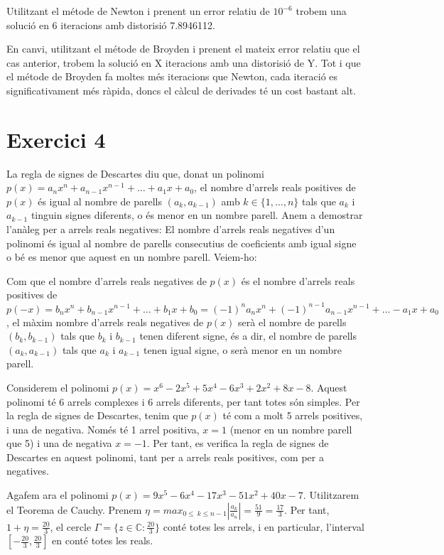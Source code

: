 \documentclass{article}
\begin{document}
Utilitzant el m\'etode de Newton i prenent un error relatiu de $10^{-6}$ trobem una soluci\'o en 6 iteracions amb distorisi\'o 7.8946112.

En canvi, utilitzant el m\'etode de Broyden i prenent el mateix error relatiu que el cas anterior, trobem la soluci\'o en X iteracions amb una distorisi\'o de Y. Tot i que el m\'etode de Broyden fa moltes m\'es iteracions que Newton, cada iteraci\'o es significativament m\'es r\`apida, doncs el c\`alcul de derivades t\'e un cost bastant alt.

\newpage
\section*{Exercici 4}
\quad La regla de signes de Descartes diu que, donat un polinomi $p(x) = a_n x^n + a_{n-1} x^{n-1} + \ldots + a_1 x + a_0$,
el nombre d'arrels reals positives de $p(x)$ és igual al nombre de parells $(a_k, a_{k-1})$ amb $k \in \{1, \ldots, n\}$ tals que $a_k$ i $a_{k-1}$ tinguin signes diferents, o és menor en un nombre parell. Anem a demostrar l'anàleg per a arrels reals negatives: El nombre d'arrels reals negatives d'un polinomi és igual al nombre de parells consecutius de coeficients amb igual signe o bé es menor que aquest en un nombre parell. Veiem-ho:

Com que el nombre d'arrels reals negatives de $p(x)$ és el nombre d'arrels reals positives de $p(-x) = b_n x^n + b_{n-1} x^{n-1} + \ldots + b_1 x + b_0 = (-1)^n a_n x^n + (-1)^{n-1} a_{n-1} x^{n-1} + \ldots - a_1 x + a_0$, el màxim nombre d'arrels reals negatives de $p(x)$ serà el nombre de parells $(b_k, b_{k-1})$ tals que $b_k$ i $b_{k-1}$ tenen diferent signe, és a dir, el nombre de parells $(a_k, a_{k-1})$ tals que $a_k$ i $a_{k-1}$ tenen igual signe, o serà menor en un nombre parell.

Considerem el polinomi $p(x) = x^6 - 2x^5 + 5x^4 - 6x^3 + 2x^2 + 8x - 8$. Aquest polinomi té 6 arrels complexes i 6 arrels diferents, per tant totes són simples. Per la regla de signes de Descartes, tenim que $p(x)$ té com a molt 5 arrels positives, i una de negativa. Només té 1 arrel positiva, $x = 1$ (menor en un nombre parell que 5) i una de negativa $x = -1$. Per tant, es verifica la regla de signes de Descartes en aquest polinomi, tant per a arrels reals positives, com per a negatives.

Agafem ara el polinomi $p(x) = 9x^5 - 6x^4 - 17x^3 - 51x^2 + 40x - 7$. Utilitzarem el Teorema de Cauchy. Prenem $\eta = 	max_{0\leq\ k \leq n-1} {\left\vert\frac{a_k}{a_n}\right\vert} = \frac{51}{9} = \frac{17}{3}$. Per tant, $1 + \eta = \frac{20}{3}$, el cercle $\Gamma = \{z\in\mathbb C : \frac{20}{3}\}$ conté totes les arrels, i en particular, l'interval $\left[-\frac{20}{3}, \frac{20}{3}\right]$ en conté totes les reals.
\end{document}
